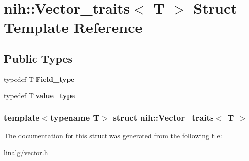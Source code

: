 \hypertarget{structnih_1_1_vector__traits}{
\section{nih\-:\-:\-Vector\-\_\-traits$<$ \-T $>$ \-Struct \-Template \-Reference}
\label{structnih_1_1_vector__traits}
}
\subsection*{\-Public \-Types}
\begin{DoxyCompactItemize}
\item 
\hypertarget{structnih_1_1_vector__traits_ad16c08f13a1ef88052f4bc714a02105d}{
typedef \-T {\bfseries \-Field\-\_\-type}}
\label{structnih_1_1_vector__traits_ad16c08f13a1ef88052f4bc714a02105d}

\item 
\hypertarget{structnih_1_1_vector__traits_a153954db2584ef66b56e53dd1a99615f}{
typedef \-T {\bfseries value\-\_\-type}}
\label{structnih_1_1_vector__traits_a153954db2584ef66b56e53dd1a99615f}

\end{DoxyCompactItemize}
\subsubsection*{template$<$typename T$>$ struct nih\-::\-Vector\-\_\-traits$<$ T $>$}



\-The documentation for this struct was generated from the following file\-:\begin{DoxyCompactItemize}
\item 
linalg/\hyperlink{vector_8h}{vector.\-h}\end{DoxyCompactItemize}
